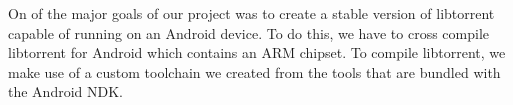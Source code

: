On of the major goals of our project was to create a stable version of libtorrent capable of running on an Android device. To do this, we have to cross compile libtorrent for  Android which contains an ARM chipset. To compile libtorrent, we make use of a custom toolchain we created from the tools that are bundled with the Android NDK.